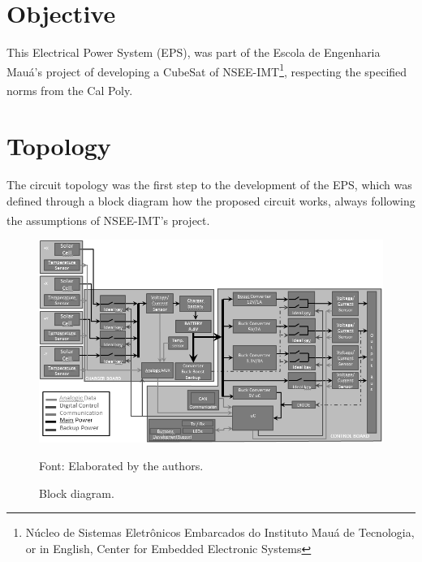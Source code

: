 \documentclass[3p]{elsarticle}
\begin{document}

\section{Objective}
\label{Objective}

	This Electrical Power System (EPS), was part of the Escola de Engenharia Mau\'{a}'s project of developing a CubeSat of NSEE-IMT\footnote{N\'{u}cleo de Sistemas Eletr\^{o}nicos Embarcados do Instituto Mau\'{a} de Tecnologia, or in English, Center for Embedded Electronic Systems}, respecting the specified norms from the Cal Poly.\textsuperscript{\cite{CubeSat}}%
	
\section{Topology}
\label{Topologia}

	The circuit topology was the first step to the development of the EPS, which was defined through a block diagram how the proposed circuit works, always following the assumptions of NSEE-IMT's project.\textsuperscript{\cite{Corsi}}

	\begin{figure}[th]
		\label{Fig_diag}
		\centering
		\includegraphics[width=0.8\linewidth]{./figs/diag}
		\caption{Block diagram.}
		\begin{footnotesize}
		Font: Elaborated by the authors.
		\end{footnotesize}
	\end{figure}
	
	
\end{document}
